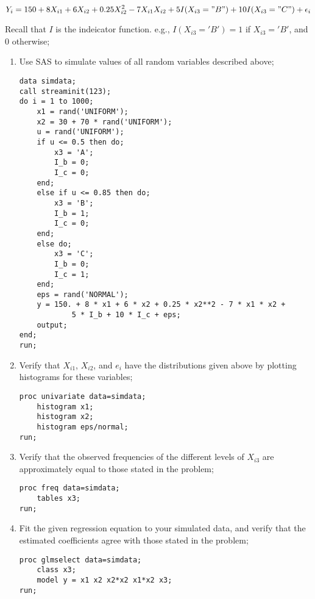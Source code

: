 \documentclass[11pt]{article}
\begin{document}
\begin{enumerate}
	\begin{equation*}
	Y_i = 150 + 8 X_{i1} + 6 X_{i2} + 0.25 X_{i2}^2 - 7 X_{i1} X_{i2}
			  + 5I(X_{i3} = "B") + 10I(X_{i3} = "C") + \epsilon_i
	\end{equation*}
  
	Recall that $I$ is the indeicator function. 
	e.g., $I(X_{i3} = 'B') = 1$ if $X_{i3} = 'B'$, and 0 otherwise;

	\begin{enumerate}
	\item Use SAS to simulate values of all random variables 
		described above;

\begin{Verbatim}
data simdata;
call streaminit(123);
do i = 1 to 1000;
	x1 = rand('UNIFORM');
	x2 = 30 + 70 * rand('UNIFORM');
	u = rand('UNIFORM');
	if u <= 0.5 then do;
		x3 = 'A';
		I_b = 0;
		I_c = 0;
	end;
	else if u <= 0.85 then do;
		x3 = 'B';
		I_b = 1;
		I_c = 0;
	end;
	else do;
		x3 = 'C';
		I_b = 0;
		I_c = 1;
	end;
	eps = rand('NORMAL');
	y = 150. + 8 * x1 + 6 * x2 + 0.25 * x2**2 - 7 * x1 * x2 + 
			5 * I_b + 10 * I_c + eps;
	output;
end;
run;
\end{Verbatim}

	\item Verify that $X_{i1}$, $X_{i2}$, and $e_i$ have the 
		distributions given above by plotting histograms 
		for these variables;

\begin{Verbatim}
proc univariate data=simdata;
	histogram x1;
	histogram x2;
	histogram eps/normal;
run;
\end{Verbatim}
		
	\item Verify that the observed frequencies of the different 
		levels of $X_{i3}$ are approximately equal to those stated 
		in the problem;

\begin{Verbatim}
proc freq data=simdata;
	tables x3;
run;
\end{Verbatim}

	\item Fit the given regression equation to your simulated 
		data, and verify that the estimated coefficients agree 
		with those stated in the problem; 


\begin{Verbatim}
proc glmselect data=simdata;
	class x3;
	model y = x1 x2 x2*x2 x1*x2 x3;
run;
\end{Verbatim}

\end{enumerate}
\end{enumerate}


\end{document}
